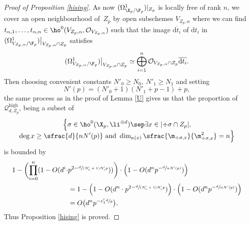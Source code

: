 \begin{proof}[Proof of Proposition \ref{hising}]
As now $(\Omega^1_{\X_p/\F_p})|_{Z_p}$ is locally free of rank $n$, we cover an open neighbourhood of~$Z_p$ by open subschemes $V_{Z_p,\alpha}$ where we can find $t_{\alpha,1},\dots,t_{\alpha,n}\in \ho^0(V_{Z_p,\alpha},\mathcal{O}_{V_{Z_p,\alpha}})$ such that the image $\overline{\mathrm{d}t_i}$ of ${\mathrm{d}t_i}$ in $(\Omega^1_{V_{Z_p,\alpha}/\F_p})\big|_{{V_{Z_p,\alpha}\cap Z_p}}$ satisfies\vspace*{-3pt}
\[
(\Omega^1_{V_{Z_p,\alpha}/\F_p})\big|_{V_{Z_p,\alpha}\cap Z_p}\simeq \bigoplus_{i=1}^n\mathcal{O}_{V_{Z_p,\alpha}\cap Z_p}\overline{\mathrm{d}t_i}.
\]
Then choosing convenient constants $N'_0\geq N_0,\ N'_1\geq N_1$ and setting\vspace*{-3pt}
\[
N'(p)=(N'_0+1)(N'_1+p-1)+p,
\]
the same process as in the proof of Lemma \ref{U} gives us that the proportion of $\mathcal{Q}_{d,Z_p}^{\mathrm{high}}$, being a subset of\vspace*{-3pt}
\begin{multline*}
\Bigl\{ \sigma\in \ho^0(\X_{p}, \li^{\otimes d})\sep \exists x\in |{\div\sigma\cap Z_p}|,\\[-5pt]
\deg x\geq \sfrac{d}{nN'(p)}\text{ and } \dim_{\kappa(x)}\sfrac{\m_{\div \sigma,x}}{\m^2_{\div \sigma, x}}=n \Bigr\}
\end{multline*}
is bounded by
\begin{align*}
1-\biggl(\prod_{i=0}^{n}(1-O(d^i\cdot& p^{2-\sfrac{d}{(N'_0+1)N'_1p}})) \biggr) \cdot \left(1-O(d^{n}p^{-\sfrac{d}{nN'(p)}}) \right) \\
&=1-\left(1-O(d^{n}\cdot p^{2-\sfrac{d}{(N'_0+1)N'_1p}})\right)\cdot \left(1-O(d^{n}p^{-\sfrac{d}{nN'(p)}}) \right) \\
&=O\bigl(d^{n}p^{-c'_1\sfrac{d}{p}} \bigr).
\end{align*}
Thus Proposition \ref{hising} is proved.
\end{proof}

\label{step4}

